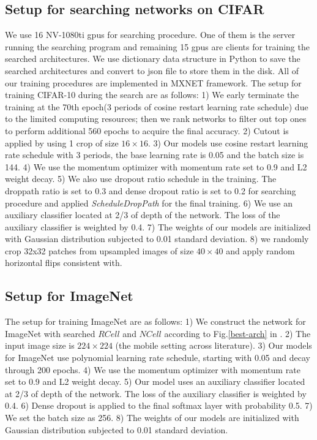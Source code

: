 \documentclass[10pt,twocolumn,letterpaper]{article}
\begin{document}
\subsection{Setup for searching networks on CIFAR}
\label{ap:mcts_setup_cifar}
We use 16 NV-1080ti gpus for searching procedure. One of them is the server running the searching program and remaining 15 gpus are clients for training the searched architectures. We use dictionary data structure in Python to save the searched architectures and convert to json file to store them in the disk. All of our training procedures are implemented in MXNET framework.
The setup for training CIFAR-10 during the search are as follows: 1) We early terminate the training at the 70th epoch(3 periods of cosine restart learning rate schedule\cite{cosine_restart}) due to the limited computing resources; then we rank networks to filter out top ones to perform additional 560 epochs to acquire the final accuracy.
2) Cutout is applied \cite{zoph2017learning} by using 1 crop of size $16\times16$. 3) Our models use cosine restart learning rate schedule\cite{cosine_restart} with 3 periods, the base learning rate is 0.05 and the batch size is 144. 4) We use the momentum optimizer with momentum rate set to 0.9 and L2 weight decay. 5) We also use dropout ratio schedule in the training. The droppath ratio is set to 0.3 and dense dropout ratio is set to 0.2 for searching procedure and applied \textit{ScheduleDropPath}\cite{zoph2017learning} for the final training. 6) We use an auxiliary classifier located at 2/3 of depth of the network. The loss of the auxiliary classifier is weighted by 0.4\cite{SzegedyVISW15}. 7) The weights of our models are initialized with Gaussian distribution subjected to 0.01 standard deviation. 8) we randomly crop 32x32
patches from upsampled images of size $40\times40$ and apply random horizontal flips consistent with\cite{zoph2017learning}. 

\subsection{Setup for ImageNet}
\label{ap:setup_img}
The setup for training ImageNet are as follows: 1) We construct the network for ImageNet with searched $RCell$ and $NCell$ according to Fig.\ref{best-arch} in \cite{zoph2017learning}. 2) The input image size is $224\times224$ (the mobile setting across literature). 3) Our models for ImageNet use polynomial learning rate schedule, starting with 0.05 and decay through 200 epochs. 4) We use the momentum optimizer with momentum rate set to 0.9 and L2 weight decay. 5) Our model uses an auxiliary classifier located at 2/3 of depth of the network. The loss of the auxiliary classifier is weighted by 0.4\cite{SzegedyVISW15}. 6) Dense dropout is applied to the final softmax layer with probability 0.5. 7) We set the batch size as 256. 8) The weights of our models are initialized with Gaussian distribution subjected to 0.01 standard deviation. 
\end{document}
